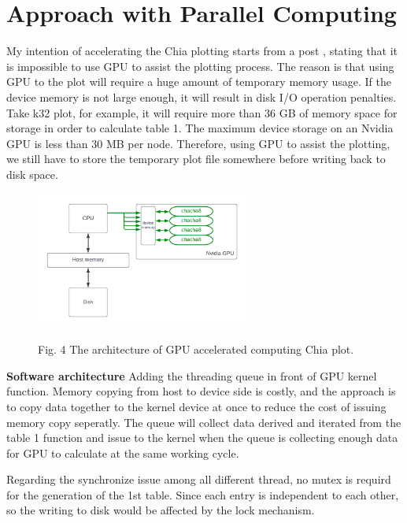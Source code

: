 \documentclass[sigconf, nonacm, natbib=false]{acmart}
\begin{document}
\section{Approach with Parallel Computing}
My intention of accelerating the Chia plotting starts from a post \parencite*[]{why_not_gpu_chia}, stating that it is impossible to use GPU to assist the plotting process. The reason is that using GPU to the plot will require a huge amount of temporary memory usage. If the device memory is not large enough, it will result in disk I/O operation penalties. Take k32 plot, for example, it will require more than 36 GB of memory space for storage in order to calculate table 1. The maximum device storage on an Nvidia GPU is less than 30 MB per node. Therefore, using GPU to assist the plotting, we still have to store the temporary plot file somewhere before writing back to disk space. 
\begin{figure}[ht]
  \begin{center}
  \includegraphics[height=4.5cm, width=7cm]{Chia_GPU_architecture.png}
  \end{center}
  {\footnotesize Fig. 4 The architecture of GPU accelerated computing Chia plot.}
  \end{figure}
{\bf Software architecture}
Adding the threading queue in front of GPU kernel function. Memory copying from host to device side is costly, and the approach is to copy data together to the kernel device at once to reduce the cost of issuing memory copy seperatly. The queue will collect data derived and iterated from the table 1 function and issue to the kernel when the queue is collecting enough data for GPU to calculate at the same working cycle. 

Regarding the synchronize issue among all different thread, no mutex is requird for the generation of the 1st table. Since each entry is independent to each other, so the writing to disk would be affected by the lock mechanism.  
\end{document}
